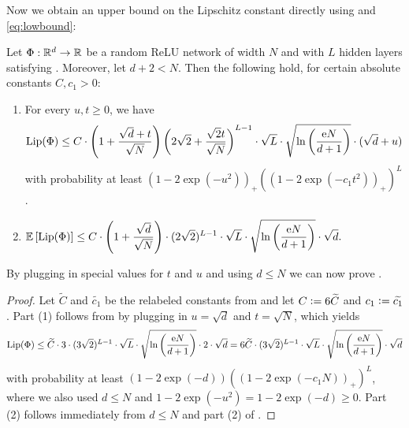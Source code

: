 Now we obtain an upper bound on the Lipschitz constant directly using  and \eqref{eq:lowbound}:
\begin{theorem}\label{thm:final_deep_lipschitz}
Let $\Phi: \mathbb{R}^d \to \mathbb{R}$ be a random ReLU network of width $N$ and with $L$ hidden layers satisfying . Moreover, let $d+2<N$. Then the following hold, for certain absolute constants $C, c_1 > 0:$
\begin{enumerate}
\item{For every $u,t \geq 0$, we have
\begin{align*}
\operatorname{Lip}(\Phi)\leq C \cdot \left(1 + \frac{\sqrt{d} + t}{\sqrt{N}}\right)\left(2\sqrt{2} + \frac{\sqrt{2} t}{\sqrt{N}}\right)^{L-1} \cdot \sqrt{L} \cdot \sqrt{\ln \left(\frac{\mathrm{e} N}{d+1}\right)} \cdot (\sqrt{d} + u)
\end{align*}
with probability at least $(1-2\exp(-u^2))_+\left((1-2\exp(-c_1 t^2))_+\right)^L$.
}
\item{
$\displaystyle
\mathbb{E} \left[\operatorname{Lip}(\Phi) \right]
\leq C \cdot \left( 1 + \frac{\sqrt{d}}{\sqrt{N}}\right) \cdot (2 \sqrt{2})^{L-1} \cdot \sqrt{L} \cdot \sqrt{\ln \left(\frac{\mathrm{e} N}{d+1}\right)} \cdot \sqrt{d}.
$
}
\end{enumerate}
\end{theorem}
 By plugging in special values for $t$ and $u$ and using $d \leq N$ we can now prove .

\renewcommand*{\proofname}{Proof of \Cref{thm:main_2}}
\begin{proof}
Let $\widetilde{C}$ and $\widetilde{c_1}$ be the relabeled constants from  and let $C \mathrel{\mathop:}= 6\widetilde{C}$ and $c_1 \mathrel{\mathop:}= \widetilde{c_1}$. 
Part (1) follows from  by plugging in $u = \sqrt{d}$ and $t = \sqrt{N}$, which yields
\begin{equation*}
\operatorname{Lip}(\Phi)\leq \widetilde{C} \cdot 3 \cdot (3\sqrt{2})^{L-1} \cdot \sqrt{L} \cdot \sqrt{\ln \left(\frac{\mathrm{e} N}{d+1}\right)} \cdot 2\cdot \sqrt{d} = 6\widetilde{C} \cdot (3\sqrt{2})^{L-1} \cdot \sqrt{L}\cdot \sqrt{\ln \left(\frac{\mathrm{e} N}{d+1}\right)} \cdot \sqrt{d}
\end{equation*}
with probability at least $(1-2\exp(-d))\left((1-2\exp(-c_1 N))_+\right)^L$,
where we also used $d \leq N$ and $1-2\exp(-u^2) = 1-2\exp(-d) \geq 0$.
Part (2) follows immediately from $d \leq N$ and part (2) of .
\end{proof}
\renewcommand*{\proofname}{Proof}
